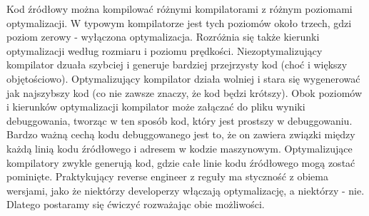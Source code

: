Kod źródłowy można kompilować różnymi kompilatorami z różnym poziomami optymalizacji. W typowym kompilatorze jest tych poziomów około trzech, gdzi poziom zerowy - wyłączona optymalizacja. Rozróżnia się także kierunki optymalizacji według rozmiaru i poziomu prędkości. Niezoptymalizujący kompilator dzuała szybciej i generuje bardziej przejrzysty kod (choć i większy objętościowo). Optymalizujący kompilator działa wolniej i stara się wygenerować jak najszybszy kod (co nie zawsze znaczy, że kod będzi krótszy). Obok poziomów i kierunków optymalizacji kompilator może załączać do pliku wyniki debuggowania, tworząc w ten sposób kod, który jest prostszy w debuggowaniu. Bardzo ważną cechą kodu debuggowanego jest to, że on zawiera związki między każdą linią kodu źródłowego i adresem w kodzie maszynowym. Optymalizujące kompilatory zwykle generują kod, gdzie całe linie kodu źródłowego mogą zostać pominięte. Praktykujący reverse engineer z reguły ma styczność z obiema wersjami, jako że niektórzy developerzy włączają optymalizację, a niektórzy - nie. Dlatego postaramy się ćwiczyć rozważając obie możliwości.

